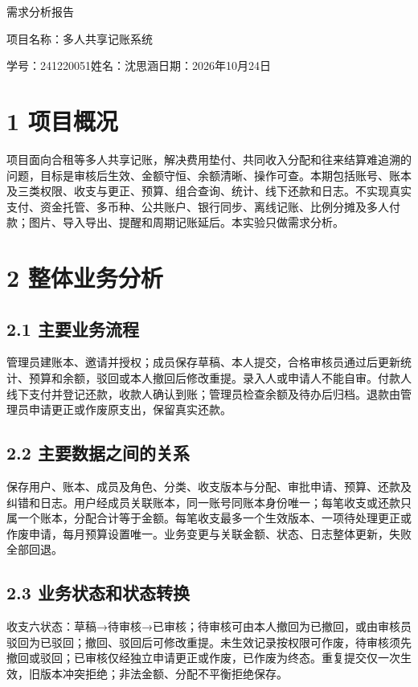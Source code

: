 \documentclass[10pt,a4paper]{article}
\begin{document}
\begin{center}\sffamily\fontsize{18}{24}\selectfont 需求分析报告\end{center}
项目名称：多人共享记账系统

学号：241220051\quad 姓名：沈思涵\quad 日期：2026年10月24日


\section*{1 项目概况}
项目面向合租等多人共享记账，解决费用垫付、共同收入分配和往来结算难追溯的问题，目标是审核后生效、金额守恒、余额清晰、操作可查。本期包括账号、账本及三类权限、收支与更正、预算、组合查询、统计、线下还款和日志。不实现真实支付、资金托管、多币种、公共账户、银行同步、离线记账、比例分摊及多人付款；图片、导入导出、提醒和周期记账延后。本实验只做需求分析。

\section*{2 整体业务分析}
\subsection*{2.1 主要业务流程}
管理员建账本、邀请并授权；成员保存草稿、本人提交，合格审核员通过后更新统计、预算和余额，驳回或本人撤回后修改重提。录入人或申请人不能自审。付款人线下支付并登记还款，收款人确认到账；管理员检查余额及待办后归档。退款由管理员申请更正或作废原支出，保留真实还款。

\subsection*{2.2 主要数据之间的关系}
保存用户、账本、成员及角色、分类、收支版本与分配、审批申请、预算、还款及纠错和日志。用户经成员关联账本，同一账号同账本身份唯一；每笔收支或还款只属一个账本，分配合计等于金额。每笔收支最多一个生效版本、一项待处理更正或作废申请，每月预算设置唯一。业务变更与关联金额、状态、日志整体更新，失败全部回退。

\subsection*{2.3 业务状态和状态转换}
收支六状态：草稿→待审核→已审核；待审核可由本人撤回为已撤回，或由审核员驳回为已驳回；撤回、驳回后可修改重提。未生效记录按权限可作废，待审核须先撤回或驳回；已审核仅经独立申请更正或作废，已作废为终态。重复提交仅一次生效，旧版本冲突拒绝；非法金额、分配不平衡拒绝保存。
\end{document}
